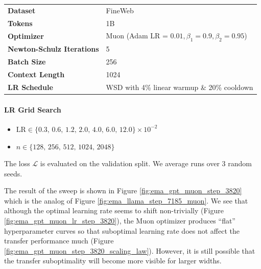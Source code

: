 \begin{table}[ht]
\centering
\small
\renewcommand{\arraystretch}{1.2}
\begin{tabular}{@{}ll@{}}
\toprule
\textbf{Dataset}       & FineWeb                                        \\ 
\addlinespace
\textbf{Tokens}        & 1B                                                   \\ 
\addlinespace
\textbf{Optimizer}     & Muon (Adam LR = $0.01, \beta_1=0.9, \beta_2=0.95$) \\
\addlinespace
\textbf{Newton-Schulz Iterations} & 5 \\
\addlinespace
\textbf{Batch Size}     & 256 \\
\addlinespace
\textbf{Context Length}     & 1024 \\

\addlinespace
\textbf{LR Schedule}   & WSD with 4\% linear warmup \& 20\% cooldown         \\ 
\bottomrule
\end{tabular}
\end{table}



\paragraph{LR Grid Search}
\begin{itemize}[nosep,leftmargin=*]
  \item \(\displaystyle \mathrm{LR} \in \{0.3,\, 0.6,\, 1.2,\, 2.0,\, 4.0,\, 6.0,\,12.0
\}\times10^{-2}\)
  
  \vspace{2mm}
  
  \item \(n \in \{128,\,256,\,512,\,1024,\,2048\}\)
\end{itemize}
The loss \(\mathcal{L}\) is evaluated on the validation split. We average runs over 3 random seeds.

The result of the sweep is shown in Figure \ref{fig:ema_gpt_muon_step_3820} which is the analog of Figure \ref{fig:ema_llama_step_7185_muon}. We see that although the optimal learning rate seems to shift non-trivially (Figure \ref{fig:ema_gpt_muon_lr_step_3820}), the Muon optimizer produces ``flat'' hyperparameter curves so that suboptimal learning rate does not affect the transfer performance much (Figure \ref{fig:ema_gpt_muon_step_3820_scaling_law}). However, it is still possible that the transfer suboptimality will become more visible for larger widths.

